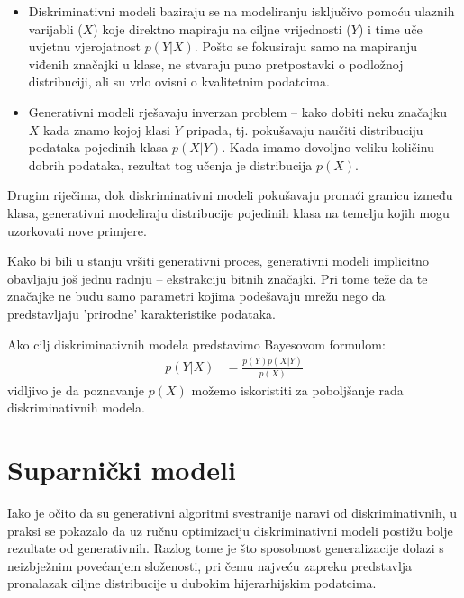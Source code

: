 \documentclass[lmodern, utf8, seminar]{fer}
\begin{document}
\renewcommand{\labelitemi}{\textbullet}
\begin{itemize} 
\item Diskriminativni modeli baziraju se na modeliranju isključivo pomoću ulaznih varijabli ($X$) koje direktno mapiraju na ciljne vrijednosti ($Y$) i time uče uvjetnu vjerojatnost $p(Y|X)$. Pošto se fokusiraju samo na mapiranju viđenih značajki u klase, ne stvaraju puno pretpostavki o podložnoj distribuciji, ali su vrlo ovisni o kvalitetnim podatcima.

\item Generativni modeli rješavaju inverzan problem -- kako dobiti neku značajku $X$ kada znamo kojoj klasi $Y$ pripada, tj. pokušavaju naučiti distribuciju podataka pojedinih klasa $p(X|Y)$. Kada imamo dovoljno veliku količinu dobrih podataka, rezultat tog učenja je  distribucija $p(X)$.
\newline
\end{itemize}

Drugim riječima, dok diskriminativni modeli pokušavaju pronaći granicu između klasa, generativni modeliraju distribucije pojedinih klasa na temelju kojih mogu uzorkovati nove primjere.
\newline


\newpage
Kako bi bili u stanju vršiti generativni proces, generativni modeli implicitno obavljaju još jednu radnju -- ekstrakciju bitnih značajki. Pri tome teže da te značajke ne budu samo parametri kojima podešavaju mrežu nego da predstavljaju 'prirodne' karakteristike podataka. 
\newline

Ako cilj diskriminativnih modela predstavimo Bayesovom formulom:
\begin{equation}
\begin{split}
p(Y|X) &= \frac{p(Y)p(X|Y)}{p(X)}
\end{split}
\end{equation}
vidljivo je da poznavanje $p(X)$ možemo iskoristiti za poboljšanje rada diskriminativnih modela.

\newpage
\section{Suparnički modeli}
Iako je očito da su generativni algoritmi svestranije naravi od diskriminativnih, u praksi se pokazalo da uz ručnu optimizaciju diskriminativni modeli postižu bolje rezultate od generativnih. Razlog tome je što sposobnost generalizacije dolazi s neizbježnim povećanjem složenosti, pri čemu najveću zapreku predstavlja pronalazak ciljne distribucije u dubokim hijerarhijskim podatcima.
\end{document}
